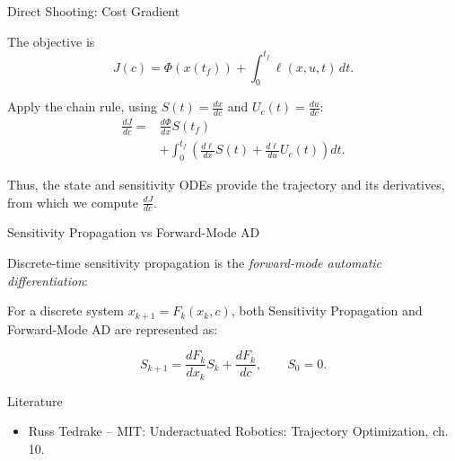 \documentclass{beamer}
\begin{document}
\begin{frame}{Direct Shooting: Cost Gradient}
	\begin{flushleft}
		The objective is
		\[
		J(c)=\Phi(x(t_f))
		+\int_0^{t_f}\ell(x,u,t)\,dt.
		\]
		
		Apply the chain rule, using
		$S(t)=\frac{dx}{dc}$ and $U_c(t)=\frac{du}{dc}$:
		\[
		\boxed{
			\begin{aligned}
				\frac{dJ}{dc}
				={}&
				\frac{d\Phi}{dx}S(t_f)\\
				&+
				\int_0^{t_f}
				\left(
				\frac{d\ell}{dx}S(t)
				+
				\frac{d\ell}{du}U_c(t)
				\right)dt.
			\end{aligned}
		}
		\]
		
		\bigskip
		
		Thus, the state and sensitivity ODEs provide the
		trajectory and its derivatives, from which we compute
		$\frac{dJ}{dc}$.
	\end{flushleft}
\end{frame}



\begin{frame}{Sensitivity Propagation vs Forward-Mode AD}
	\begin{flushleft}
		
		Discrete-time sensitivity propagation is the \emph{forward-mode automatic differentiation}:

		\bigskip

		For a discrete system $x_{k+1}=F_k(x_k,c)$, both Sensitivity Propagation and Forward-Mode AD are represented as:
		
		\[ \boxed{ S_{k+1} = \frac{dF_k}{dx_k}S_k + \frac{dF_k}{dc}, \qquad S_0=0. } \]
		
		
	\end{flushleft}
\end{frame}





\begin{frame}{Literature}
	
	\begin{itemize}
		
		
		\item Russ Tedrake -- MIT:
		{Underactuated Robotics: Trajectory Optimization, ch. 10.}
		
	\end{itemize}
	
\end{frame}



\myqrframe
\end{document}
